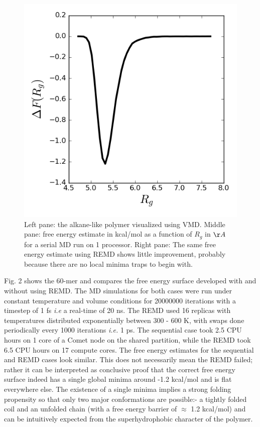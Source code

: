 \documentclass[12pt,letterpaper]{article}
\begin{document}
\begin{figure}[h!]
\includegraphics[scale=0.4]{artwork/c60_wca_parallel.png}
\caption{Left pane: the alkane-like polymer visualized using VMD\cite{vmd}. Middle pane: free energy estimate in kcal/mol as a function of $R_g$ in $\AA$ for a serial MD run on 1 processor. Right pane: The same free energy estimate using REMD shows little improvement, probably because there are no local minima traps to begin with.}
\end{figure}

\noindent Fig. 2 shows the 60-mer and compares the free energy surface developed with and without using REMD. The MD simulations for both cases were run under constant temperature and volume conditions for 20000000 iterations with a timestep of 1 fs \textit{i.e} a real-time of 20 ns. The REMD used 16 replicas with temperatures distributed exponentially between 300 - 600 K, with swaps done periodically every 1000 iterations \textit{i.e.} 1 ps. The sequential case took 2.5 CPU hours on 1 core of a Comet node on the shared partition, while the REMD took 6.5 CPU hours on 17 compute cores. The free energy estimates for the sequential and REMD cases look similar. This does not necessarily mean the REMD failed; rather it can be interpreted as conclusive proof that the correct free energy surface indeed has a single global minima around -1.2 kcal/mol and is flat everywhere else. The existence of a single minima implies a strong folding propensity so that only two major conformations are possible:- a tightly folded coil and an unfolded chain (with a free energy barrier of $\approx$ 1.2 kcal/mol) and can be intuitively expected from the superhydrophobic character of the polymer.\\
\end{document}
